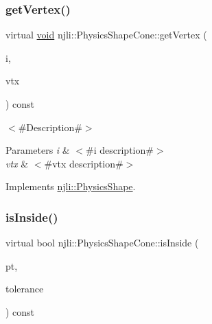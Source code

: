 \mbox{\label{classnjli_1_1_physics_shape_cone_af77e8177d252806cdfaeb05ae88bc305}} 
\subsubsection{\texorpdfstring{get\+Vertex()}{getVertex()}}
{\footnotesize\ttfamily virtual \mbox{\hyperlink{_thread_8h_af1e856da2e658414cb2456cb6f7ebc66}{void}} njli\+::\+Physics\+Shape\+Cone\+::get\+Vertex (\begin{DoxyParamCaption}\item[{int}]{i,  }\item[{bt\+Vector3 \&}]{vtx }\end{DoxyParamCaption}) const\hspace{0.3cm}{\ttfamily [virtual]}}

$<$\#\+Description\#$>$


\begin{DoxyParams}{Parameters}
{\em i} & $<$\#i description\#$>$ \\
\hline
{\em vtx} & $<$\#vtx description\#$>$ \\
\hline
\end{DoxyParams}


Implements \mbox{\hyperlink{classnjli_1_1_physics_shape_acb05a16bdbfa5cee6dcbab5c253eb78e}{njli\+::\+Physics\+Shape}}.

\mbox{\label{classnjli_1_1_physics_shape_cone_a9641ea16321a24d8eccef232761b5197}} 
\subsubsection{\texorpdfstring{is\+Inside()}{isInside()}}
{\footnotesize\ttfamily virtual bool njli\+::\+Physics\+Shape\+Cone\+::is\+Inside (\begin{DoxyParamCaption}\item[{const bt\+Vector3 \&}]{pt,  }\item[{\mbox{\hyperlink{_util_8h_a5f6906312a689f27d70e9d086649d3fd}{f32}}}]{tolerance }\end{DoxyParamCaption}) const\hspace{0.3cm}{\ttfamily [virtual]}}

